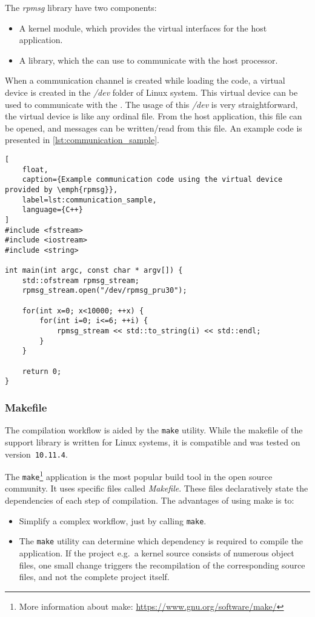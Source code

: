 The \emph{rpmsg} library have two components:
\begin{itemize}
	\item A kernel module, which provides the virtual interfaces for the host application.
	\item A \cpl{} library, which the \pru{} can use to communicate with the host processor.
\end{itemize}

When a communication channel is created while loading the \pru{} code, a virtual device is created in the \emph{/dev} folder of Linux system. This virtual device can be used to communicate with the \pru{}. The usage of this \emph{/dev} is very straightforward, the virtual device is like any ordinal file. From the host application, this file can be opened, and messages can be written/read from this file. An example code is presented in \cref{lst:communication_sample}.

\begin{lstlisting}[
	float,
	caption={Example communication code using the virtual device provided by \emph{rpmsg}},
	label=lst:communication_sample,
	language={C++}
]
#include <fstream>
#include <iostream>
#include <string>

int main(int argc, const char * argv[]) {
	std::ofstream rpmsg_stream;
	rpmsg_stream.open("/dev/rpmsg_pru30");

	for(int x=0; x<10000; ++x) {
		for(int i=0; i<=6; ++i) {
			rpmsg_stream << std::to_string(i) << std::endl;
		}
	}

	return 0;
}
\end{lstlisting}

\subsubsection{Makefile}

The compilation workflow is aided by the \verb+make+ utility. While the makefile of the support library is written for Linux systems, it is compatible and was tested on \osx{} version~\verb|10.11.4|.

The \verb+make+\footnote{More information about make: \url{https://www.gnu.org/software/make/}} application is the most popular build tool in the open source community. It uses specific files called \emph{Makefile}. These files declaratively state the dependencies of each step of compilation. The advantages of using make is to:
\begin{itemize}
	\item Simplify a complex workflow, just by calling \verb+make+.
	\item The \verb+make+ utility can determine which dependency is required to compile the application. If the project e.g.\ a kernel source consists of numerous object files, one small change triggers the recompilation of the corresponding source files, and not the complete project itself.
\end{itemize}

